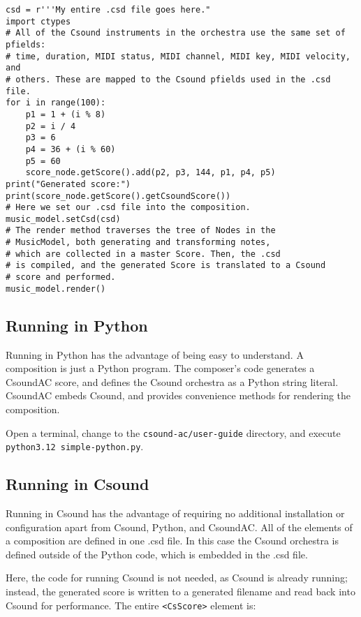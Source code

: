 \documentclass[letterpaper,10pt,DIV=12]{scrartcl}
\begin{document}
\begin{lstlisting}[basicstyle=\small\ttfamily]
csd = r'''My entire .csd file goes here."
import ctypes
# All of the Csound instruments in the orchestra use the same set of pfields:
# time, duration, MIDI status, MIDI channel, MIDI key, MIDI velocity, and 
# others. These are mapped to the Csound pfields used in the .csd file.
for i in range(100):
    p1 = 1 + (i % 8)
    p2 = i / 4
    p3 = 6
    p4 = 36 + (i % 60)
    p5 = 60
    score_node.getScore().add(p2, p3, 144, p1, p4, p5)
print("Generated score:")
print(score_node.getScore().getCsoundScore())
# Here we set our .csd file into the composition.
music_model.setCsd(csd)
# The render method traverses the tree of Nodes in the 
# MusicModel, both generating and transforming notes, 
# which are collected in a master Score. Then, the .csd 
# is compiled, and the generated Score is translated to a Csound 
# score and performed.
music_model.render()
\end{lstlisting}

\subsection{Running in Python}

Running in Python has the advantage of being easy to understand. A composition is just a Python program. The composer's code generates a CsoundAC score, and defines the Csound orchestra as a Python string literal. CsoundAC embeds Csound, and provides convenience methods for rendering the composition.

Open a terminal, change to the \lstinline|csound-ac/user-guide| directory, and execute \lstinline|python3.12 simple-python.py|.

\subsection{Running in Csound}

Running in Csound has the advantage of requiring no additional installation or configuration apart from Csound, Python, and CsoundAC. All of the elements of a composition are defined in one .csd file. In this case the Csound orchestra is defined outside of the Python code, which is embedded in the .csd file.

Here, the code for running Csound is not needed, as Csound is already running; instead, the generated score is written to a generated filename and read back into Csound for performance. The entire \lstinline|<CsScore>| element is:
\end{document}
